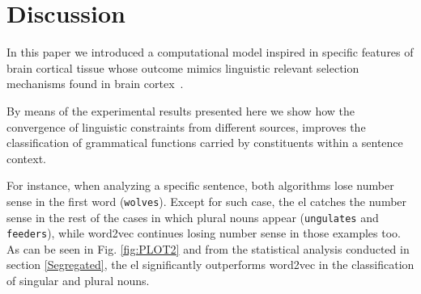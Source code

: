 {%
}{
\section{Discussion}

In this paper we introduced a computational model inspired in specific features of brain cortical tissue whose outcome mimics linguistic relevant selection mechanisms found in brain cortex~\cite{Gibson1998-GIBCOS, Hagoort2005OnBB, Rego1993TheCB, 10.1371/journal.pone.0177794}.

By means of the experimental results presented here we show how the convergence of linguistic constraints from different sources, improves the classification of grammatical functions carried by constituents within a sentence context.

For instance, when analyzing a specific sentence, both algorithms lose number sense in the first word (\texttt{wolves}). Except for such case, the \gls{el} catches the number sense in the rest of the cases in which plural nouns appear (\texttt{ungulates} and \texttt{feeders}), while word2vec continues losing number sense in those examples too.
As can be seen in Fig. \ref{fig:PLOT2} and from the statistical analysis conducted in section \ref{Segregated}, the \gls{el} significantly outperforms word2vec in the classification of singular and plural nouns.

}

